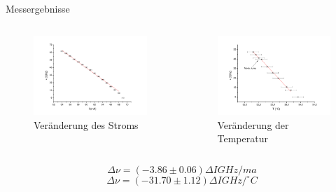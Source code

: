 \documentclass{beamer}
\begin{document}
\begin{frame}{Messergebnisse}
\begin{columns}
\begin{column}{5cm}
	\begin{figure}[H]
	\centering \includegraphics[width=1\textwidth]{Bilder/T_fest.pdf}
	\caption{Veränderung des Stroms}
	\end{figure}
\end{column}
\begin{column}{5cm}
	\begin{figure}[H]
	\centering \includegraphics[width=1\textwidth]{Bilder/I_fest.pdf}
	\caption{Veränderung der Temperatur}
	\end{figure}
\end{column}
\end{columns}
$$\Delta\nu = (-3.86 \pm 0.06)\Delta I GHz/ma$$
$$\Delta\nu = (-31.70 \pm 1.12)\Delta I GHz/^\circ C$$
\end{frame}
\end{document}
